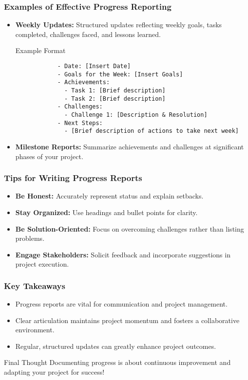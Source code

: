 \documentclass[aspectratio=169]{beamer}
\begin{document}
\begin{frame}[fragile]
    \frametitle{Examples of Effective Progress Reporting}
    \begin{itemize}
        \item \textbf{Weekly Updates:} Structured updates reflecting weekly goals, tasks completed, challenges faced, and lessons learned.
        \begin{block}{Example Format}
            \begin{verbatim}
            - Date: [Insert Date]
            - Goals for the Week: [Insert Goals]
            - Achievements:
              - Task 1: [Brief description]
              - Task 2: [Brief description]
            - Challenges:
              - Challenge 1: [Description & Resolution]
            - Next Steps:
              - [Brief description of actions to take next week]
            \end{verbatim}
        \end{block}
        \item \textbf{Milestone Reports:} Summarize achievements and challenges at significant phases of your project.
    \end{itemize}
\end{frame}

\begin{frame}[fragile]
    \frametitle{Tips for Writing Progress Reports}
    \begin{itemize}
        \item \textbf{Be Honest:} Accurately represent status and explain setbacks.
        \item \textbf{Stay Organized:} Use headings and bullet points for clarity.
        \item \textbf{Be Solution-Oriented:} Focus on overcoming challenges rather than listing problems.
        \item \textbf{Engage Stakeholders:} Solicit feedback and incorporate suggestions in project execution.
    \end{itemize}
\end{frame}

\begin{frame}[fragile]
    \frametitle{Key Takeaways}
    \begin{itemize}
        \item Progress reports are vital for communication and project management.
        \item Clear articulation maintains project momentum and fosters a collaborative environment.
        \item Regular, structured updates can greatly enhance project outcomes.
    \end{itemize}
    \begin{block}{Final Thought}
        Documenting progress is about continuous improvement and adapting your project for success!
    \end{block}
\end{frame}
\end{document}
